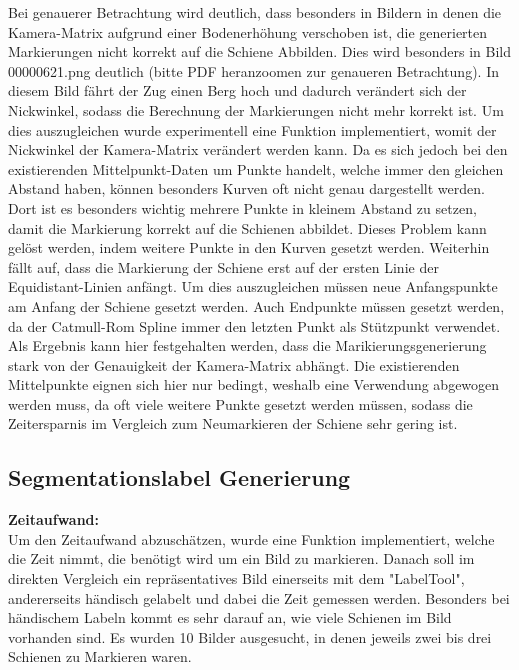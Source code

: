 \documentclass[11pt]{scrartcl}
\begin{document}
\noindent
Bei genauerer Betrachtung wird deutlich, dass besonders in Bildern in denen die Kamera-Matrix aufgrund einer Bodenerhöhung verschoben ist, die generierten Markierungen nicht korrekt auf die Schiene Abbilden. Dies wird besonders in Bild 00000621.png deutlich (bitte PDF heranzoomen zur genaueren Betrachtung). In diesem Bild fährt der Zug einen Berg hoch und dadurch verändert sich der Nickwinkel, sodass die Berechnung der Markierungen nicht mehr korrekt ist. Um dies auszugleichen wurde experimentell eine Funktion implementiert, womit der Nickwinkel der Kamera-Matrix verändert werden kann. Da es sich jedoch bei den existierenden Mittelpunkt-Daten um Punkte handelt, welche immer den gleichen Abstand haben, können besonders Kurven oft nicht genau dargestellt werden. Dort ist es besonders wichtig mehrere Punkte in kleinem Abstand zu setzen, damit die Markierung korrekt auf die Schienen abbildet. Dieses Problem kann gelöst werden, indem weitere Punkte in den Kurven gesetzt werden. Weiterhin fällt auf, dass die Markierung der Schiene erst auf der ersten Linie der Equidistant-Linien anfängt. Um dies auszugleichen müssen neue Anfangspunkte am Anfang der Schiene gesetzt werden. Auch Endpunkte müssen gesetzt werden, da der Catmull-Rom Spline immer den letzten Punkt als Stützpunkt verwendet. Als Ergebnis kann hier festgehalten werden, dass die Marikierungsgenerierung stark von der Genauigkeit der Kamera-Matrix abhängt. Die existierenden Mittelpunkte eignen sich hier nur bedingt, weshalb eine Verwendung abgewogen werden muss, da oft viele weitere Punkte gesetzt werden müssen, sodass die Zeitersparnis im Vergleich zum Neumarkieren der Schiene sehr gering ist.

\subsection{Segmentationslabel Generierung}
\label{sec:Segmentationslabel Generierung}


\textbf{Zeitaufwand:}
\\

\noindent
Um den Zeitaufwand abzuschätzen, wurde eine Funktion implementiert, welche die Zeit nimmt, die benötigt wird um ein Bild zu markieren. Danach soll im direkten Vergleich ein repräsentatives Bild einerseits mit dem "LabelTool", andererseits händisch gelabelt und dabei die Zeit gemessen werden. Besonders bei händischem Labeln kommt es sehr darauf an, wie viele Schienen im Bild vorhanden sind. Es wurden 10 Bilder ausgesucht, in denen jeweils zwei bis drei Schienen zu Markieren waren. 
\\
\end{document}
